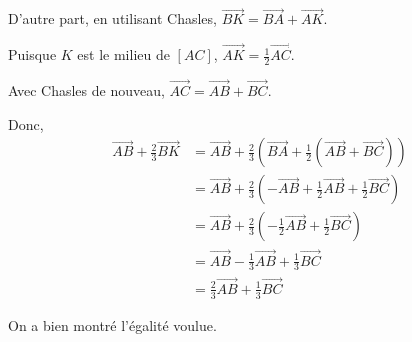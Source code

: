 \documentclass[a4paper,12pt, french, noSujetB]{article}
\begin{document}
	\smallskip
	D'autre part, en utilisant Chasles, $\vec{BK} = \vec{BA}+\vec{AK}$.

	Puisque $K$ est le milieu de $[AC]$, $\vec{AK} = \frac{1}{2}\vec{AC}$.

	Avec Chasles de nouveau, $\vec{AC} = \vec{AB}+\vec{BC}$.

	Donc, \begin{align*}
		\vec{AB}+\frac{2}{3}\vec{BK}
		&= \vec{AB}+\frac{2}{3}(\vec{BA}+\frac{1}{2}(\vec{AB}+\vec{BC}))\\
		&= \vec{AB}+\frac{2}{3}(-\vec{AB}+\frac{1}{2}\vec{AB}+\frac{1}{2}\vec{BC})\\
		&= \vec{AB}+\frac{2}{3}(-\frac{1}{2}\vec{AB}+\frac{1}{2}\vec{BC})\\
		&= \vec{AB}-\frac{1}{3}\vec{AB}+\frac{1}{3}\vec{BC}\\
		&= \frac{2}{3}\vec{AB}+\frac{1}{3}\vec{BC}
	\end{align*}

	\smallskip
	On a bien montré l'égalité voulue.
\end{document}
